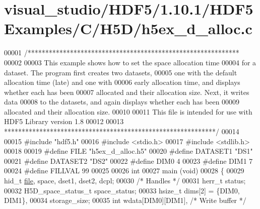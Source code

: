 \hypertarget{visual__studio_2_h_d_f5_21_810_81_2_h_d_f5_examples_2_c_2_h5_d_2h5ex__d__alloc_8c_source}{}\section{visual\+\_\+studio/\+H\+D\+F5/1.10.1/\+H\+D\+F5\+Examples/\+C/\+H5\+D/h5ex\+\_\+d\+\_\+alloc.c}
\label{visual__studio_2_h_d_f5_21_810_81_2_h_d_f5_examples_2_c_2_h5_d_2h5ex__d__alloc_8c_source}

\begin{DoxyCode}
00001 \textcolor{comment}{/************************************************************}
00002 \textcolor{comment}{}
00003 \textcolor{comment}{  This example shows how to set the space allocation time}
00004 \textcolor{comment}{  for a dataset.  The program first creates two datasets,}
00005 \textcolor{comment}{  one with the default allocation time (late) and one with}
00006 \textcolor{comment}{  early allocation time, and displays whether each has been}
00007 \textcolor{comment}{  allocated and their allocation size.  Next, it writes data}
00008 \textcolor{comment}{  to the datasets, and again displays whether each has been}
00009 \textcolor{comment}{  allocated and their allocation size.}
00010 \textcolor{comment}{}
00011 \textcolor{comment}{  This file is intended for use with HDF5 Library version 1.8}
00012 \textcolor{comment}{}
00013 \textcolor{comment}{ ************************************************************/}
00014 
00015 \textcolor{preprocessor}{#include "hdf5.h"}
00016 \textcolor{preprocessor}{#include <stdio.h>}
00017 \textcolor{preprocessor}{#include <stdlib.h>}
00018 
00019 \textcolor{preprocessor}{#define FILE            "h5ex\_d\_alloc.h5"}
00020 \textcolor{preprocessor}{#define DATASET1        "DS1"}
00021 \textcolor{preprocessor}{#define DATASET2        "DS2"}
00022 \textcolor{preprocessor}{#define DIM0            4}
00023 \textcolor{preprocessor}{#define DIM1            7}
00024 \textcolor{preprocessor}{#define FILLVAL         99}
00025 
00026 \textcolor{keywordtype}{int}
00027 main (\textcolor{keywordtype}{void})
00028 \{
00029     hid\_t                   \hyperlink{structfile}{file}, space, dset1, dset2, dcpl;
00030                                                     \textcolor{comment}{/* Handles */}
00031     herr\_t                  status;
00032     H5D\_space\_status\_t      space\_status;
00033     hsize\_t                 dims[2] = \{DIM0, DIM1\},
00034                             storage\_size;
00035     \textcolor{keywordtype}{int}                     wdata[DIM0][DIM1],      \textcolor{comment}{/* Write buffer */}

\end{DoxyCode}

